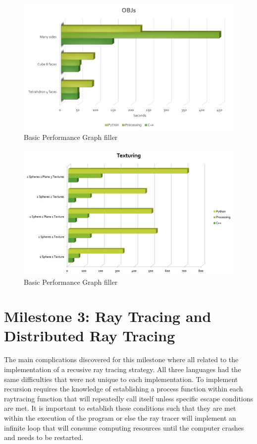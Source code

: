 \begin{figure}[ht]
\centering
\includegraphics[width=\textwidth]{figures/graphs/obj-graph.png}
\caption{Basic Performance Graph filler}
\label{fig:basicgraph}
\end{figure}

\begin{figure}[ht]
\centering
\includegraphics[width=\textwidth]{figures/graphs/texturing.png}
\caption{Basic Performance Graph filler}
\label{fig:basicgraph}
\end{figure}

\section{Milestone 3: Ray Tracing and Distributed Ray Tracing}
The main complications discovered for this milestone where all related to the implementation of a recusive ray tracing strategy.  All three languages had the same difficulties that were not unique to each implementation.  To implement recursion requires the knowledge of establishing a process function within each raytracing function that will repeatedly call itself unless specific escape conditions are met.  It is important to establish these conditions such that they are met within the execution of the program or else the ray tracer will implement an infinite loop that will consume computing resources until the computer crashes and needs to be restarted.  

